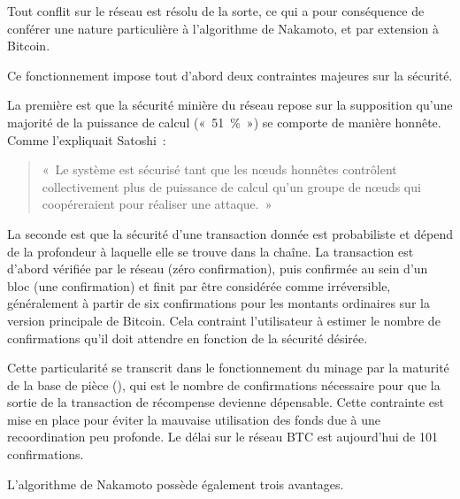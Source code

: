 Tout conflit sur le réseau est résolu de la sorte, ce qui a pour conséquence de conférer une nature particulière à l'algorithme de Nakamoto, et par extension à Bitcoin.



Ce fonctionnement impose tout d'abord deux contraintes majeures sur la sécurité.

La première est que la sécurité minière du réseau repose sur la supposition qu'une majorité de la puissance de calcul («~51~\%~») se comporte de manière honnête. Comme l'expliquait Satoshi~:

\begin{quote}
«~Le système est sécurisé tant que les nœuds honnêtes contrôlent collectivement plus de puissance de calcul qu'un groupe de nœuds qui coopéreraient pour réaliser une attaque.~»
\end{quote}

La seconde est que la sécurité d'une transaction donnée est probabiliste et dépend de la profondeur à laquelle elle se trouve dans la chaîne. La transaction est d'abord vérifiée par le réseau (zéro confirmation), puis confirmée au sein d'un bloc (une confirmation) et finit par être considérée comme irréversible, généralement à partir de six confirmations pour les montants ordinaires sur la version principale de Bitcoin. Cela contraint l'utilisateur à estimer le nombre de confirmations qu'il doit attendre en fonction de la sécurité désirée.

Cette particularité se transcrit dans le fonctionnement du minage par la maturité de la base de pièce (), qui est le nombre de confirmations nécessaire pour que la sortie de la transaction de récompense devienne dépensable. Cette contrainte est mise en place pour éviter la mauvaise utilisation des fonds due à une recoordination peu profonde. Le délai sur le réseau BTC est aujourd'hui de 101 confirmations.


L'algorithme de Nakamoto possède également trois avantages. 

